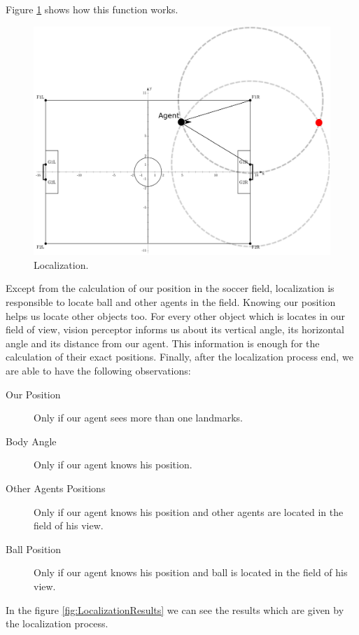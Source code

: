 Figure \ref{fig:Localization} shows how this function works.
\begin{figure}[htb!]
\centering
  \includegraphics[scale=0.5]{Chapter3/figures/Localization.pdf}
  \caption{Localization.} 
  \label{fig:Localization}
\end{figure}
Except from the calculation of our position in the soccer field, localization is responsible to locate ball and other agents in the field. Knowing our position helps us locate other objects too. For every other object which is locates in our field of view, vision perceptor informs us about its vertical angle, its horizontal angle and its distance from our agent. This information is enough for the calculation of their exact positions. Finally, after the localization process end, we are able to have the following observations:\\
\begin{description}
	\item[Our Position] Only if our agent sees more than one landmarks.
	\item[Body Angle] Only if our agent knows his position.
	\item[Other Agents Positions]	Only if our agent knows his position and other agents are located in the field of his view.
	\item[Ball Position] Only if our agent knows his position and ball is located in the field of his view.
\end{description}
In the figure \ref{fig:LocalizationResults} we can see the results which are given by the localization process.
